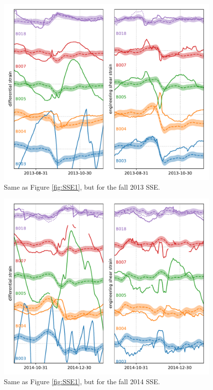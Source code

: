 \begin{figure}
\includegraphics{ch5/appendix_figures/SSE4.pdf}
\caption{Same as Figure \ref{fig:SSE1}, but for the fall 2013 SSE.}   
\label{fig:SSE4}
\end{figure}

\begin{figure}
\includegraphics{ch5/appendix_figures/SSE5.pdf}
\caption{Same as Figure \ref{fig:SSE1}, but for the fall 2014 SSE.}   
\label{fig:SSE5}
\end{figure}


